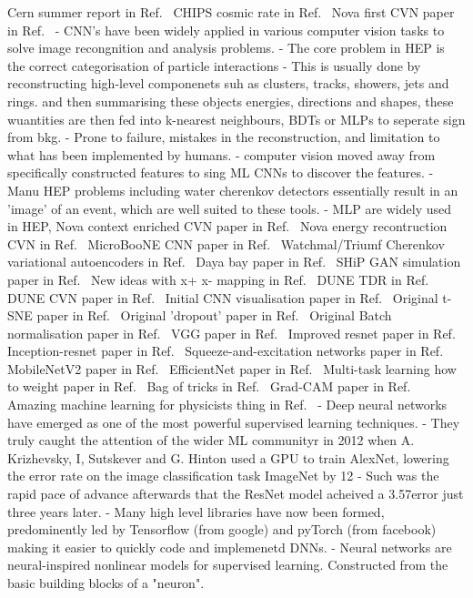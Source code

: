 Cern summer report in Ref.~\cite{theodore2016}
CHIPS cosmic rate in Ref.~\cite{son2013}
Nova first CVN paper in Ref.~\cite{aurisano2016}
- CNN's have been widely applied in various computer vision tasks to solve image recongnition and analysis problems.
- The core problem in HEP is the correct categorisation of particle interactions
- This is usually done by reconstructing high-level componenets suh as clusters, tracks, showers, jets and rings. and
then summarising these objects energies, directions and shapes, these wuantities are then fed into k-nearest neighbours,
BDTs or MLPs to seperate sign from bkg.
- Prone to failure, mistakes in the reconstruction, and limitation to what has been implemented by humans.
- computer vision moved away from specifically constructed features to sing ML CNNs to discover the features.
- Manu HEP problems including water cherenkov detectors essentially result in an 'image' of an event, which are well suited to these tools.
- MLP are widely used in HEP,
Nova context enriched CVN paper in Ref.~\cite{psihas2019}
Nova energy recontruction CVN in Ref.~\cite{baldi2019}
MicroBooNE CNN paper in Ref.~\cite{acciarri2017}
Watchmal/Triumf Cherenkov variational autoencoders in Ref.~\cite{abhishek2019}
Daya bay paper in Ref.~\cite{racah2016}
SHiP GAN simulation paper in Ref.~\cite{ahdida2019}
New ideas with x+ x- mapping in Ref.~\cite{berns2020}
DUNE TDR in Ref.~\cite{abi2020}
DUNE CVN paper in Ref.~\cite{collaboration2020}
Initial CNN visualisation paper in Ref.~\cite{zeiler2013}
Original t-SNE paper in Ref.~\cite{maaten2008}
Original 'dropout' paper in Ref.~\cite{hinton2012}
Original Batch normalisation paper in Ref.~\cite{ioffe2015}
VGG paper in Ref.~\cite{simonyan2014}
Improved resnet paper in Ref.~\cite{he2016}
Inception-resnet paper in Ref.~\cite{szegedy2016}
Squeeze-and-excitation networks paper in Ref.~\cite{hu2017}
MobileNetV2 paper in Ref.~\cite{sandler2018}
EfficientNet paper in Ref.~\cite{tan2019}
Multi-task learning how to weight paper in Ref.~\cite{kendall2017}
Bag of tricks in Ref.~\cite{he2018}
Grad-CAM paper in Ref.~\cite{elvaraju2019}
Amazing machine learning for physicists thing in Ref.~\cite{mehta2019}
- Deep neural networks have emerged as one of the most powerful supervised learning techniques.
- They truly caught the attention of the wider ML communityr in 2012 when A. Krizhevsky, I, Sutskever and G. Hinton used a GPU to train
AlexNet, lowering the error rate on the image classification task ImageNet by 12%
- Such was the rapid pace of advance afterwards that the ResNet model acheived a 3.57\percent error just three years later.
- Many high level libraries have now been formed, predominently led by Tensorflow (from google) and pyTorch (from facebook) making it easier to quickly code and implemenetd DNNs.
- Neural networks are neural-inspired nonlinear models for supervised learning. Constructed from the basic building blocks of a "neuron".